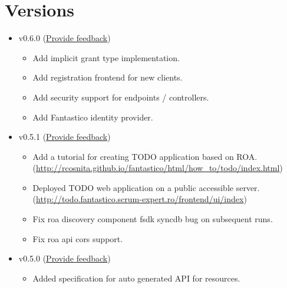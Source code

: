 \documentclass[letterpaper,10pt,english]{sphinxmanual}
\begin{document}
\section{Versions}
\label{changes:versions}\begin{itemize}
\item {} 
v0.6.0 (\href{https://docs.google.com/forms/d/1tKBopU3lfDB\_w8F4h7Rl1Rn4uydAJq-nha09L\_ptJck/edit?usp=sharing}{Provide feedback})
\begin{itemize}
\item {} 
Add implicit grant type implementation.

\item {} 
Add registration frontend for new clients.

\item {} 
Add security support for endpoints / controllers.

\item {} 
Add Fantastico identity provider.

\end{itemize}

\item {} 
v0.5.1 (\href{https://docs.google.com/forms/d/1tKBopU3lfDB\_w8F4h7Rl1Rn4uydAJq-nha09L\_ptJck/edit?usp=sharing}{Provide feedback})
\begin{itemize}
\item {} 
Add a tutorial for creating TODO application based on ROA. (\href{http://rcosnita.github.io/fantastico/html/how\_to/todo/index.html}{http://rcosnita.github.io/fantastico/html/how\_to/todo/index.html})

\item {} 
Deployed TODO web application on a public accessible server. (\href{http://todo.fantastico.scrum-expert.ro/frontend/ui/index}{http://todo.fantastico.scrum-expert.ro/frontend/ui/index})

\item {} 
Fix roa discovery component fsdk syncdb bug on subsequent runs.

\item {} 
Fix roa api cors support.

\end{itemize}

\item {} 
v0.5.0 (\href{https://docs.google.com/forms/d/1tKBopU3lfDB\_w8F4h7Rl1Rn4uydAJq-nha09L\_ptJck/edit?usp=sharing}{Provide feedback})
\begin{itemize}
\item {} 
Added specification for auto generated API for resources.


\end{itemize}
\end{itemize}
\end{document}
